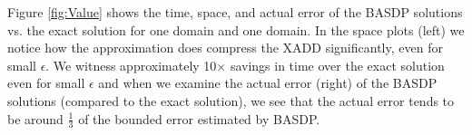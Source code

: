 Figure \ref{fig:Value} shows the time, space, and actual error of the
BASDP solutions vs. the exact solution for one \MarsRoverBi domain and one 
\Invent domain.  In the space plots (left) we notice how the
approximation does compress the XADD significantly, even for small
$\epsilon$.  We witness approximately 10$\times$ savings in time over
the exact solution even for small $\epsilon$ and when we examine the
actual error (right) of the BASDP solutions (compared to the exact
solution), we see that the actual error tends to be around
$\frac{1}{3}$ of the bounded error estimated by BASDP.


